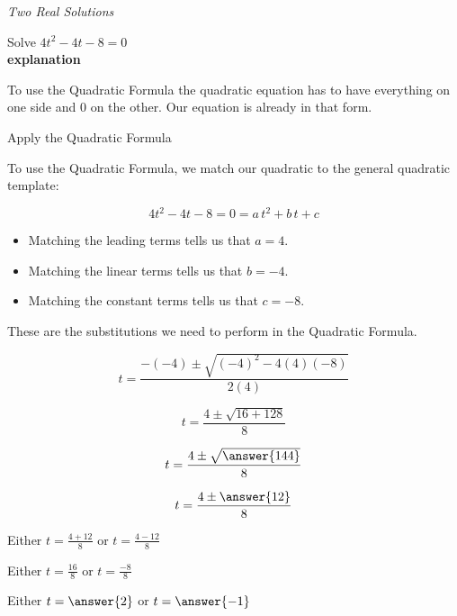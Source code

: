 \documentclass{ximera}
\begin{document}
\begin{example} \textit{Two Real Solutions} 

Solve $4 t^2 - 4 t - 8 = 0$ \\


\textbf{\textcolor{red!75!green}{explanation}} 


To use the Quadratic Formula the quadratic equation has to have everything on one side and $0$ on the other.  Our equation is already in that form.

Apply the Quadratic Formula




To use the Quadratic Formula, we match our quadratic to the general quadratic template:

\[
4 t^2 - 4 t - 8 = 0 = a \, t^2 + b \, t + c
\]


\begin{itemize}
\item Matching the leading terms tells us that $a = 4$.
\item Matching the linear terms tells us that $b = -4$.
\item Matching the constant terms tells us that $c = -8$.
\end{itemize}

These are the substitutions we need to perform in the Quadratic Formula.


















\[   t = \frac{-(-4) \pm \sqrt{(-4)^2 - 4 (4) (-8)}}{2 (4)}            \]

\[   t = \frac{4 \pm \sqrt{16 + 128}}{8}            \]

\[   t = \frac{4 \pm \sqrt{\answer{144}}}{8}            \]

\[   t = \frac{4 \pm \answer{12}}{8}            \]




Either $t = \frac{4 + 12}{8} $ or $t = \frac{4 - 12}{8} $

Either $t = \frac{16}{8} $ or $t = \frac{-8}{8} $

Either $t = \answer{2}$ or $t = \answer{-1}$



\end{example}
\end{document}
